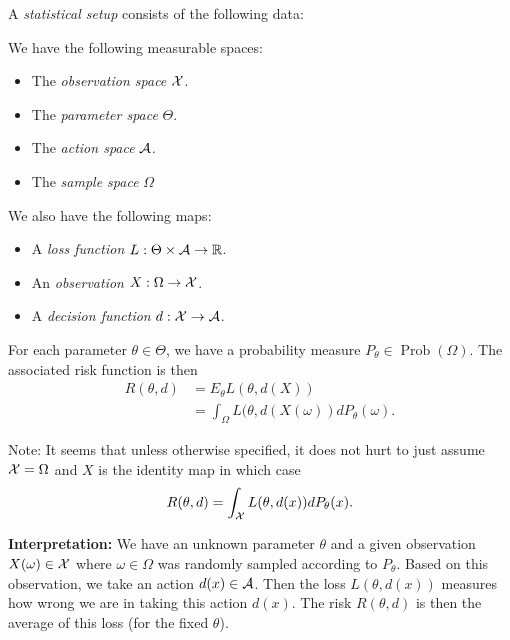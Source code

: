 \documentclass[twoside, a4paper, 10pt]{amsart}
\begin{document}
\begin{mydef} A \textit{statistical setup} consists of the following data:

We have the following measurable spaces:

\begin{itemize}
	\item The \textit{observation space} $\mathcal{X}$.
	\item The \textit{parameter space} $\Theta$.
	\item The \textit{action space} $\mathcal{A}$.
	\item The \textit{sample space} $\Omega$
\end{itemize}

We also have the following maps:

\begin{itemize}
	\item A \textit{loss function} $L:\Theta \times \mathcal{A} \to \mathbb{R}$.
	\item An \textit{observation} $X: \Omega \to \mathcal{X}$.
	\item A \textit{decision function} $d:\mathcal{X} \to \mathcal{A}$.

\end{itemize}

For each parameter $\theta \in \Theta$, we have a probability measure $P_{\theta} \in \operatorname{Prob}(\Omega)$. The associated risk function is then \begin{align*} R(\theta, d) &= E_{\theta} L(\theta, d(X)) \\ &= \int_{\Omega} L(\theta, d(X(\omega)) dP_{\theta}(\omega).\end{align*}

\end{mydef}

Note: It seems that unless otherwise specified, it does not hurt to just assume $\mathcal{X} = \Omega$ and $X$ is the identity map in which case $$R(\theta, d) = \int_{\mathcal{X}} L(\theta, d(x)) dP_{\theta}(x).$$

\textbf{Interpretation:} We have an unknown parameter $\theta$ and a given observation $X(\omega) \in \mathcal{X}$ where $\omega \in \Omega$ was randomly sampled according to $P_{\theta}$. Based on this observation, we take an action $d(x) \in \mathcal{A}$. Then the loss $L(\theta, d(x))$ measures how wrong we are in taking this action $d(x)$. The risk $R(\theta, d)$ is then the average of this loss (for the fixed $\theta$).
\end{document}
